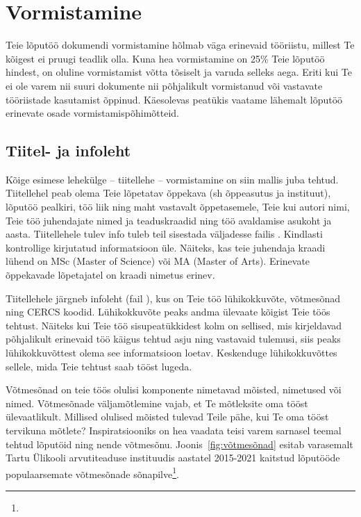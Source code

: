 \section{Vormistamine}  \label{vormistamine}
Teie lõputöö dokumendi vormistamine hõlmab väga erinevaid tööriistu, millest Te kõigest ei pruugi teadlik olla. Kuna hea vormistamine on 25\% Teie lõputöö hindest, on oluline vormistamist võtta tõsiselt ja varuda selleks aega. Eriti kui Te ei ole varem nii suuri dokumente nii põhjalikult vormistanud või vastavate tööriistade kasutamist õppinud. Käesolevas peatükis vaatame lähemalt lõputöö erinevate osade vormistamispõhimõtteid.

\subsection{Tiitel- ja infoleht}
Kõige esimese lehekülge – tiitellehe – vormistamine on siin mallis juba tehtud. Tiitellehel peab olema Teie lõpetatav õppekava (sh õppeasutus ja instituut), lõputöö pealkiri, töö liik ning maht vastavalt õppetasemele, Teie kui autori nimi, Teie töö juhendajate nimed ja teaduskraadid ning töö avaldamise asukoht ja aasta. Tiitellehele tulev info tuleb teil sisestada väljadesse failis . Kindlasti kontrollige kirjutatud informatsioon üle. Näiteks, kas teie juhendaja kraadi lühend on MSc (Master of Science) või MA (Master of Arts). Erinevate õppekavade lõpetajatel on kraadi nimetus erinev.

Tiitellehele järgneb infoleht (fail ), kus on Teie töö lühikokkuvõte, võtmesõnad ning CERCS koodid. Lühikokkuvõte peaks andma ülevaate kõigist Teie töös tehtust. Näiteks kui Teie töö sisupeatükkidest kolm on sellised, mis kirjeldavad põhjalikult erinevaid töö käigus tehtud asju ning vastavaid tulemusi, siis peaks lühikokkuvõttest olema see informatsioon loetav. Keskenduge lühikokkuvõttes sellele, mida Teie tehtust saab tööst lugeda.

Võtmesõnad on teie töös olulisi komponente nimetavad mõisted, nimetused või nimed. Võtmesõnade väljamõtlemine vajab, et Te mõtleksite oma tööst ülevaatlikult. Millised olulised mõisted tulevad Teile pähe, kui Te oma tööst tervikuna mõtlete? Inspiratsiooniks on hea vaadata teisi varem sarnasel teemal tehtud lõputöid ning nende võtmesõnu. Joonis~\ref{fig:võtmesõnad} esitab varasemalt Tartu Ülikooli arvutiteaduse instituudis aastatel 2015-2021 kaitstud lõputööde populaarsemate võtmesõnade sõnapilve\footnote{}.

